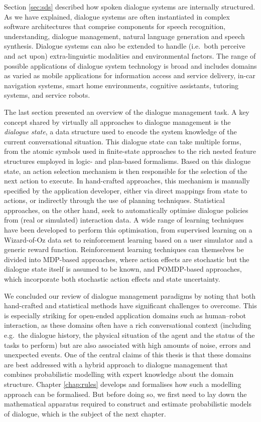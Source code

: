 Section \ref{sec:sds} described how spoken dialogue systems are internally structured. As we have explained, dialogue systems are often instantiated in complex software architectures that comprise components for speech recognition, understanding, dialogue management, natural language generation and speech synthesis.  Dialogue systems can also be extended to handle (i.e.\ both perceive and act upon) extra-linguistic modalities and environmental factors. The range of possible applications of dialogue system technology is broad and includes domains as varied as mobile applications for information access and service delivery, in-car navigation systems, smart home environments, cognitive assistants, tutoring systems, and service robots. 

The last section presented an overview of the dialogue management task. A key concept shared by virtually all approaches to dialogue management is the \textit{dialogue state}, a data structure used to encode the system knowledge of the current conversational situation.  This dialogue state can take multiple forms, from the atomic symbols used in finite-state approaches to the rich nested feature structures employed in logic- and plan-based formalisms. Based on this dialogue state, an action selection mechanism is then responsible for the selection of the next action to execute.  In hand-crafted approaches, this mechanism is manually specified by the application developer, either via direct mappings from state to actions, or indirectly through the use of planning techniques.  Statistical approaches, on the other hand, seek to automatically optimise dialogue policies from (real or simulated) interaction data.  A wide range of learning techniques have been developed to perform this optimisation, from supervised learning on a Wizard-of-Oz data set to reinforcement learning based on a user simulator and a generic reward function.   Reinforcement learning techniques can themselves be divided into MDP-based approaches, where action effects are stochastic but the dialogue state itself is assumed to be known, and POMDP-based approaches, which incorporate both stochastic action effects and state uncertainty.

We concluded our review of dialogue management paradigms by noting that both hand-crafted and statistical methods have significant challenges to overcome.  This is especially striking for open-ended application domains such as human--robot interaction, as these domains often have a rich conversational context (including e.g.\ the dialogue history, the physical situation of the agent and the status of the tasks to perform) but are also associated with high amounts of noise, errors and unexpected events. One of the central claims of this thesis is that these domains are best addressed with a hybrid approach to dialogue management that combines probabilistic modelling with expert knowledge about the domain structure.  Chapter \ref{chap:rules} develops and formalises how such a modelling approach can be formalised.  But before doing so, we first need to lay down the mathematical apparatus required to construct and estimate probabilistic models of dialogue, which is the subject of the next chapter.

